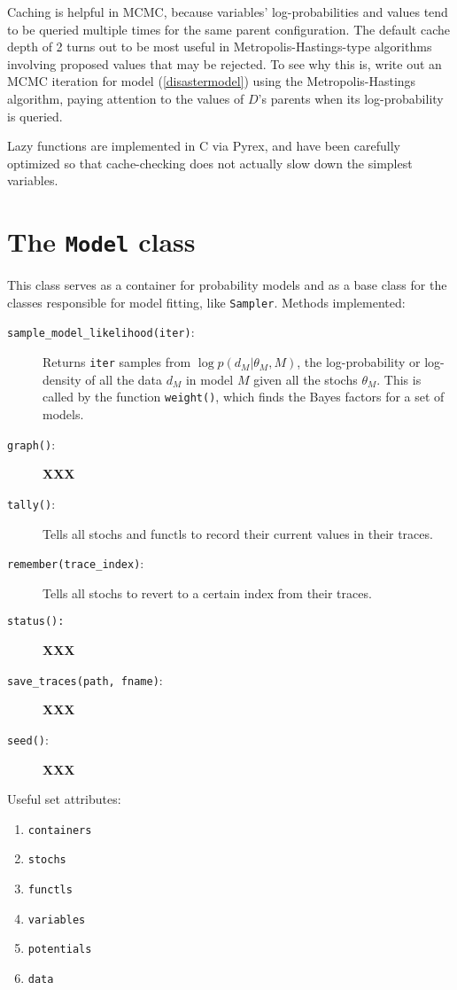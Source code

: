 Caching is helpful in MCMC, because variables' log-probabilities and values tend to be queried multiple times for the same parent configuration. The default cache depth of 2 turns out to be most useful in Metropolis-Hastings-type algorithms involving proposed values that may be rejected. To see why this is, write out an MCMC iteration for model (\ref{disastermodel}) using the Metropolis-Hastings algorithm, paying attention to the values of $D$'s parents when its log-probability is queried.

Lazy functions are implemented in C via Pyrex, and have been carefully optimized so that cache-checking does not actually slow down the simplest variables.


\section{The \texttt{Model} class} \label{sec:Model}
This class serves as a container for probability models and as a base class for the classes responsible for model fitting, like \texttt{Sampler}. Methods implemented:
\begin{description}
    \item[\texttt{sample\_model\_likelihood(\texttt{iter})}:] Returns \texttt{iter} samples from $\log p(d_M|\theta_M, M)$, the log-probability or log-density of all the data $d_M$ in model $M$ given all the stochs $\theta_M$. This is called by the function \texttt{weight()}, which finds the Bayes factors for a set of models.
    \item[\texttt{graph()}:] \textbf{XXX}
    \item[\texttt{tally()}:] Tells all stochs and functls to record their current values in their traces.
    \item[\texttt{remember(trace\_index)}:] Tells all stochs to revert to a certain index from their traces.
    \item[\texttt{status():}] \textbf{XXX}
    \item[\texttt{save\_traces(path, fname)}:] \textbf{XXX}
    \item[\texttt{seed()}:] \textbf{XXX}
\end{description}

Useful set attributes:
\begin{enumerate}
    \item \texttt{containers}
    \item \texttt{stochs}
    \item \texttt{functls}
    \item \texttt{variables}
    \item \texttt{potentials}
    \item \texttt{data}
\end{enumerate}



